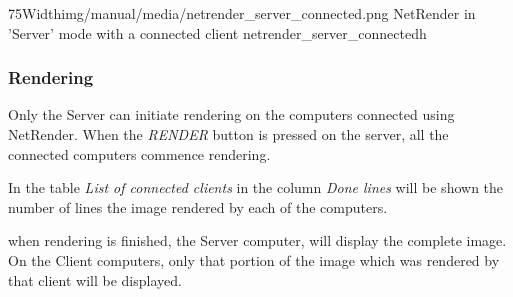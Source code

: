 \simpleImageWithCaption75Width{img/manual/media/netrender_server_connected.png}
{NetRender in 'Server' mode with a connected client}
{netrender_server_connected}{h}

\subsubsection{Rendering}\label{rendering}

Only the Server can initiate rendering on the computers connected using
NetRender. When the \emph{RENDER} button is pressed on the server, all the
connected computers commence rendering.

In the table \emph{List of connected clients} in the column \emph{Done lines} will be
shown the number of lines the image rendered by each of the computers.

when rendering is finished, the Server computer, will display the complete
image. On the Client computers, only that portion of the image which was
rendered by that client will be displayed.
